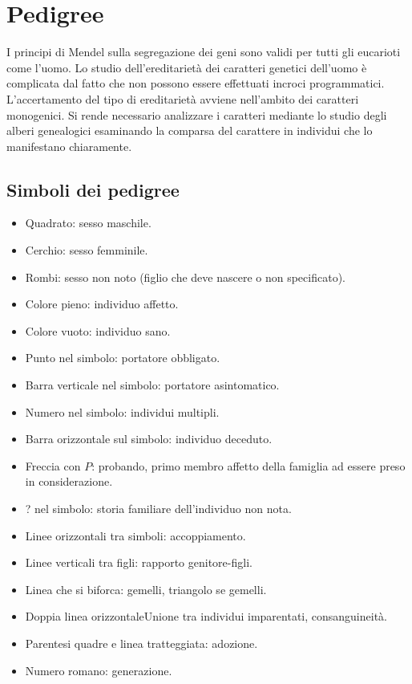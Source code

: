 \chapter{Pedigree}
I principi di Mendel sulla segregazione dei geni sono validi per tutti gli eucarioti come l'uomo. Lo studio dell'ereditariet\`a dei caratteri genetici dell'uomo \`e complicata dal
fatto che non possono essere effettuati incroci programmatici. L'accertamento del tipo di ereditariet\`a avviene nell'ambito dei caratteri monogenici. Si rende necessario analizzare
i caratteri mediante lo studio degli alberi genealogici esaminando la comparsa del carattere in individui che lo manifestano chiaramente. 
\section{Simboli dei pedigree}
\begin{multicols}{2}
	\begin{itemize}
		\item Quadrato: sesso maschile.
		\item Cerchio: sesso femminile.
		\item Rombi: sesso non noto (figlio che deve nascere o non specificato).
		\item Colore pieno: individuo affetto.
		\item Colore vuoto: individuo sano.
		\item Punto nel simbolo: portatore obbligato.
		\item Barra verticale nel simbolo: portatore asintomatico.
		\item Numero nel simbolo: individui multipli.
		\item Barra orizzontale sul simbolo: individuo deceduto.
		\item Freccia con $P$: probando, primo membro affetto della famiglia ad essere preso in considerazione.
		\item ? nel simbolo: storia familiare dell'individuo non nota. 
		\item Linee orizzontali tra simboli: accoppiamento.
		\item Linee verticali tra figli: rapporto genitore-figli.
		\item Linea che si biforca: gemelli, triangolo se gemelli.
		\item Doppia linea orizzontaleUnione tra individui imparentati, consanguineit\`a.
		\item Parentesi quadre e linea tratteggiata: adozione.
		\item Numero romano: generazione. 
	\end{itemize}
\end{multicols}
